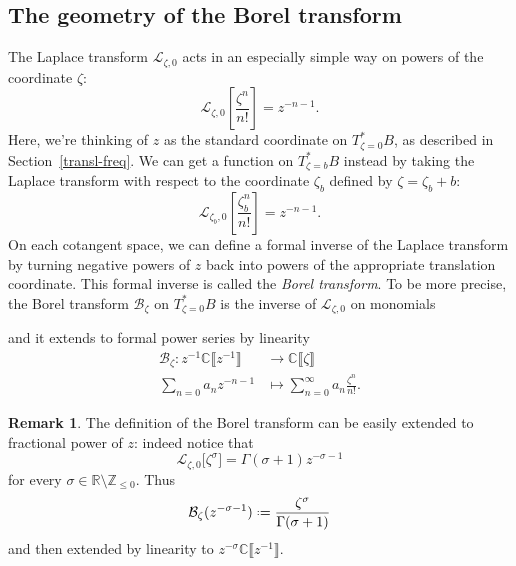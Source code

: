 \documentclass{article}
\newcommand{\maps}{\colon}
\newcommand{\Z}{\mathbb{Z}}
\newcommand{\R}{\mathbb{R}}
\newcommand{\C}{\mathbb{C}}
\newcommand*{\defeq}{\mathrel{\vcenter{\baselineskip0.5ex \lineskiplimit0pt
                     \hbox{\scriptsize.}\hbox{\scriptsize.}}}%
                     =}
\newcommand{\laplace}{\mathcal{L}}
\newcommand{\borel}{\mathcal{B}}
\theoremstyle{definition}
\newtheorem{remark}[definition]{Remark}
\theoremstyle{plain}
\begin{document}
\subsection{The geometry of the Borel transform}\label{sec:geometry_borel}
The Laplace transform $\laplace_{\zeta, 0}$ acts in an especially simple way on powers of the coordinate $\zeta$:
\[ \laplace_{\zeta, 0}\left[\frac{\zeta^n}{n!}\right] = z^{-n-1}. \]
Here, we're thinking of $z$ as the standard coordinate on $T^*_{\zeta = 0}B$, as described in Section~\ref{transl-freq}. We can get a function on $T^*_{\zeta = b}B$ instead by taking the Laplace transform with respect to the coordinate $\zeta_b$ defined by $\zeta = \zeta_b + b$:
\[ \laplace_{\zeta_b, 0}\left[\frac{\zeta_b^n}{n!}\right] = z^{-n-1}. \]
On each cotangent space, we can define a formal inverse of the Laplace transform by turning negative powers of $z$ back into powers of the appropriate translation coordinate. This formal inverse is called the {\em Borel transform}. To be more precise, the Borel transform $\borel_\zeta$ on $T^*_{\zeta = 0}B$ is the inverse of $\laplace_{\zeta,0}$ on monomials 
\begin{center}
\end{center}
and it extends to formal power series by linearity 
\begin{align*}
\borel_\zeta \maps z^{-1} \C \llbracket z^{-1} \rrbracket & \to \C \llbracket \zeta \rrbracket \\
\sum_{n=0}a_n z^{-n-1} & \mapsto \sum_{n=0}^\infty a_n \frac{\zeta^n}{n!}.
\end{align*}
\begin{remark}
The definition of the Borel transform can be easily extended to fractional power of $z$: indeed notice that   
\[\laplace_{\zeta,0}\big[\zeta^\sigma\big]=\Gamma(\sigma+1)z^{-\sigma-1}\]
for every $\sigma\in\R\setminus\Z_{\leq 0}$. Thus 
\begin{align*}
\borel_\zeta(z^{-\sigma-1})\defeq \frac{\zeta^{\sigma}}{\Gamma(\sigma+1)} 
\end{align*}
and then extended by linearity to $z^{-\sigma}\C\llbracket z^{-1}\rrbracket$. 
\end{remark}
\end{document}
